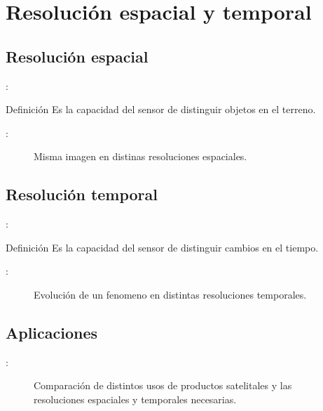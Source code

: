 \documentclass[]{beamer}
\begin{document}
\section{Resolución espacial y temporal}
\subsection{Resolución espacial}
\begin{frame}{\secname : \subsecname}
    \begin{block}{Definición}
        Es la capacidad del sensor de distinguir objetos en el terreno.
    \end{block}
\end{frame}

\begin{frame}{\secname : \subsecname}
    \begin{figure}[h!]
        \centering
        \caption{Misma imagen en distinas resoluciones espaciales.}
        \label{}
    \end{figure}
\end{frame}

\subsection{Resolución temporal}

\begin{frame}{\secname : \subsecname}
    \begin{block}{Definición}
        Es la capacidad del sensor de distinguir cambios en el tiempo.
    \end{block}
\end{frame}

\begin{frame}{\secname : \subsecname}
    \begin{figure}[h!]
        \centering
        \caption{Evolución de un fenomeno en distintas resoluciones temporales.}
        \label{}
    \end{figure}
\end{frame}

\subsection{Aplicaciones}

\begin{frame}{\secname : \subsecname}
    \begin{figure}[h!]
        \centering
        \caption{Comparación de distintos usos de productos satelitales y las resoluciones espaciales y temporales necesarias.}
        \label{}
    \end{figure}
\end{frame}
\end{document}

